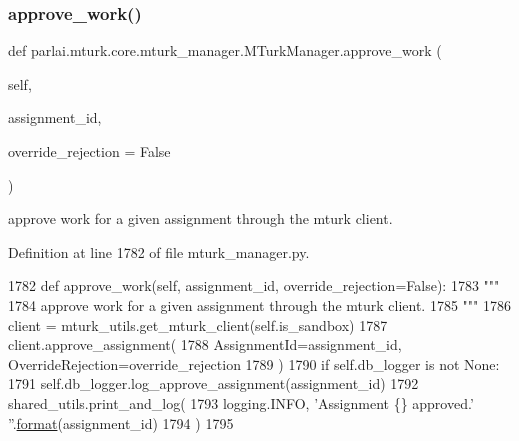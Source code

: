 \subsubsection{\texorpdfstring{approve\+\_\+work()}{approve\_work()}}
{\footnotesize\ttfamily def parlai.\+mturk.\+core.\+mturk\+\_\+manager.\+M\+Turk\+Manager.\+approve\+\_\+work (\begin{DoxyParamCaption}\item[{}]{self,  }\item[{}]{assignment\+\_\+id,  }\item[{}]{override\+\_\+rejection = {\ttfamily False} }\end{DoxyParamCaption})}

\begin{DoxyVerb}approve work for a given assignment through the mturk client.
\end{DoxyVerb}
 

Definition at line 1782 of file mturk\+\_\+manager.\+py.


\begin{DoxyCode}
1782     \textcolor{keyword}{def }approve\_work(self, assignment\_id, override\_rejection=False):
1783         \textcolor{stringliteral}{"""}
1784 \textcolor{stringliteral}{        approve work for a given assignment through the mturk client.}
1785 \textcolor{stringliteral}{        """}
1786         client = mturk\_utils.get\_mturk\_client(self.is\_sandbox)
1787         client.approve\_assignment(
1788             AssignmentId=assignment\_id, OverrideRejection=override\_rejection
1789         )
1790         \textcolor{keywordflow}{if} self.db\_logger \textcolor{keywordflow}{is} \textcolor{keywordflow}{not} \textcolor{keywordtype}{None}:
1791             self.db\_logger.log\_approve\_assignment(assignment\_id)
1792         shared\_utils.print\_and\_log(
1793             logging.INFO, \textcolor{stringliteral}{'Assignment \{\} approved.'} \textcolor{stringliteral}{''}.\hyperlink{namespaceparlai_1_1chat__service_1_1services_1_1messenger_1_1shared__utils_a32e2e2022b824fbaf80c747160b52a76}{format}(assignment\_id)
1794         )
1795 
\end{DoxyCode}
\mbox{\label{classparlai_1_1mturk_1_1core_1_1mturk__manager_1_1MTurkManager_a10c0ba44b2e46b1644620e2d496458af}} 

